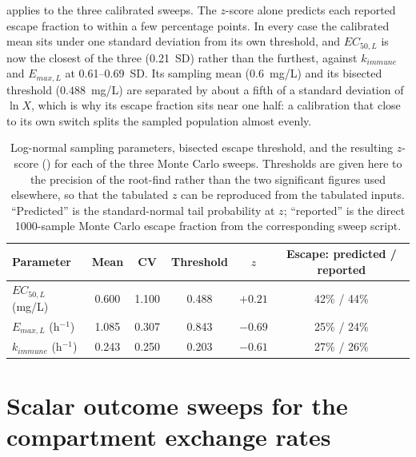 \documentclass[11pt]{article}
\begin{document}
 applies  to
the three calibrated sweeps. The $z$-score alone predicts each reported escape fraction to within a few percentage points. In every case the calibrated mean sits
under one standard deviation from its own threshold, and $EC_{50,L}$ is
now the closest of the three (0.21~SD) rather than the furthest, against
$k_{immune}$ and $E_{max,L}$ at 0.61--0.69~SD. Its sampling mean
($0.6$~mg/L) and its bisected threshold ($0.488$~mg/L) are separated by
about a fifth of a standard deviation of $\ln X$, which is why its escape
fraction sits near one half: a calibration that close to its own switch
splits the sampled population almost evenly.

\begin{table}[H]
    \centering
    \begin{tabular}{lccccc}
        \hline
        Parameter & Mean & CV & Threshold & $z$ & Escape: predicted / reported \\
        \hline
        $EC_{50,L}$ (mg/L)      & 0.600 & 1.100 & 0.488 & $+0.21$ & 42\% / 44\% \\
        $E_{max,L}$ (h$^{-1}$)  & 1.085 & 0.307 & 0.843 & $-0.69$ & 25\% / 24\% \\
        $k_{immune}$ (h$^{-1}$) & 0.243 & 0.250 & 0.203 & $-0.61$ & 27\% / 26\% \\
        \hline
    \end{tabular}
    \caption{Log-normal sampling parameters, bisected escape threshold, and
    the resulting $z$-score () for each of the three
    Monte Carlo sweeps. Thresholds are given here to the precision of the
    root-find rather than the two significant figures used elsewhere, so
    that the tabulated $z$ can be reproduced from the tabulated inputs.
    ``Predicted'' is the standard-normal tail
    probability at $z$; ``reported'' is the direct 1000-sample Monte Carlo
    escape fraction from the corresponding sweep script.}
    \label{tab:zscore_summary}
\end{table}



\section{Scalar outcome sweeps for the compartment exchange rates}
\label{sec:s7}
\end{document}
